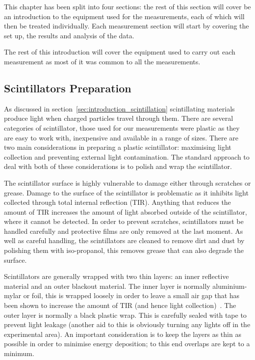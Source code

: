 This chapter has been split into four sections: the rest of this section will cover be an introduction to the equipment used for the measurements, each of which will then be treated individually. Each measurement section will start by covering the set up, the results and analysis of the data.

The rest of this introduction will cover the equipment used to carry out each measurement as most of it was common to all the measurements.
\subsection{Scintillators Preparation} %
\label{sub:scintillator_preparation}
As discussed in section~\ref{sec:introduction_scintillation} scintillating materials produce light when charged particles travel through them. There are several categories of scintillator, those used for our measurements were plastic as they are easy to work with, inexpensive and available in a range of sizes. There are two main considerations in preparing a plastic scintillator: maximising light collection and preventing external light contamination. The standard approach to deal with both of these considerations is to polish and wrap the scintillator.

The scintillator surface is highly vulnerable to damage either through scratches or grease. Damage to the surface of the scintillator is problematic as it inhibits light collected through total internal reflection (TIR). Anything that reduces the amount of TIR increases the amount of light absorbed outside of the scintillator, where it cannot be detected. In order to prevent scratches, scintillators must be handled carefully and protective films are only removed at the last moment. As well as careful handling, the scintillators are cleaned to remove dirt and dust by polishing them with iso-propanol, this removes grease that can also degrade the surface.

Scintillators are generally wrapped with two thin layers: an inner reflective material and an outer blackout material. The inner layer is normally aluminium-mylar or foil, this is wrapped loosely in order to leave a small air gap that has been shown to increase the amount of TIR (and hence light collection)~\cite{air gap to increase light collection}. The outer layer is normally a black plastic wrap. This is carefully sealed with tape to prevent light leakage (another aid to this is obviously turning any lights off in the experimental area). An important consideration is to keep the layers as thin as possible in order to minimise energy deposition; to this end overlaps are kept to a minimum.


